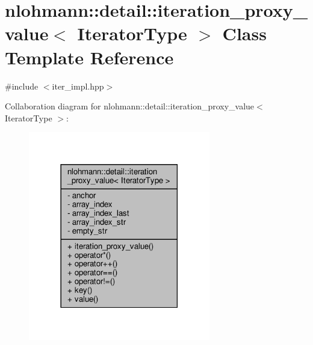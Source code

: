 \hypertarget{classnlohmann_1_1detail_1_1iteration__proxy__value}{}\section{nlohmann\+:\+:detail\+:\+:iteration\+\_\+proxy\+\_\+value$<$ Iterator\+Type $>$ Class Template Reference}
\label{classnlohmann_1_1detail_1_1iteration__proxy__value}


{\ttfamily \#include $<$iter\+\_\+impl.\+hpp$>$}



Collaboration diagram for nlohmann\+:\+:detail\+:\+:iteration\+\_\+proxy\+\_\+value$<$ Iterator\+Type $>$\+:\nopagebreak
\begin{figure}[H]
\begin{center}
\leavevmode
\includegraphics[width=225pt]{classnlohmann_1_1detail_1_1iteration__proxy__value__coll__graph}
\end{center}
\end{figure}
